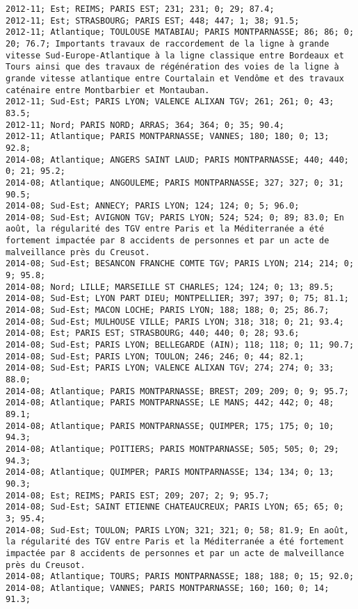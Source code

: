 \documentclass{article}
\begin{document}
\begin{Verbatim}[commandchars=\\\{\}]
2012-11; Est; REIMS; PARIS EST; 231; 231; 0; 29; 87.4; 
2012-11; Est; STRASBOURG; PARIS EST; 448; 447; 1; 38; 91.5; 
2012-11; Atlantique; TOULOUSE MATABIAU; PARIS MONTPARNASSE; 86; 86; 0; 20; 76.7; Importants travaux de raccordement de la ligne à grande vitesse Sud-Europe-Atlantique à la ligne classique entre Bordeaux et Tours ainsi que des travaux de régénération des voies de la ligne à grande vitesse atlantique entre Courtalain et Vendôme et des travaux caténaire entre Montbarbier et Montauban.
2012-11; Sud-Est; PARIS LYON; VALENCE ALIXAN TGV; 261; 261; 0; 43; 83.5; 
2012-11; Nord; PARIS NORD; ARRAS; 364; 364; 0; 35; 90.4; 
2012-11; Atlantique; PARIS MONTPARNASSE; VANNES; 180; 180; 0; 13; 92.8; 
2014-08; Atlantique; ANGERS SAINT LAUD; PARIS MONTPARNASSE; 440; 440; 0; 21; 95.2; 
2014-08; Atlantique; ANGOULEME; PARIS MONTPARNASSE; 327; 327; 0; 31; 90.5; 
2014-08; Sud-Est; ANNECY; PARIS LYON; 124; 124; 0; 5; 96.0; 
2014-08; Sud-Est; AVIGNON TGV; PARIS LYON; 524; 524; 0; 89; 83.0; En août, la régularité des TGV entre Paris et la Méditerranée a été fortement impactée par 8 accidents de personnes et par un acte de malveillance près du Creusot.
2014-08; Sud-Est; BESANCON FRANCHE COMTE TGV; PARIS LYON; 214; 214; 0; 9; 95.8; 
2014-08; Nord; LILLE; MARSEILLE ST CHARLES; 124; 124; 0; 13; 89.5; 
2014-08; Sud-Est; LYON PART DIEU; MONTPELLIER; 397; 397; 0; 75; 81.1; 
2014-08; Sud-Est; MACON LOCHE; PARIS LYON; 188; 188; 0; 25; 86.7; 
2014-08; Sud-Est; MULHOUSE VILLE; PARIS LYON; 318; 318; 0; 21; 93.4; 
2014-08; Est; PARIS EST; STRASBOURG; 440; 440; 0; 28; 93.6; 
2014-08; Sud-Est; PARIS LYON; BELLEGARDE (AIN); 118; 118; 0; 11; 90.7; 
2014-08; Sud-Est; PARIS LYON; TOULON; 246; 246; 0; 44; 82.1; 
2014-08; Sud-Est; PARIS LYON; VALENCE ALIXAN TGV; 274; 274; 0; 33; 88.0; 
2014-08; Atlantique; PARIS MONTPARNASSE; BREST; 209; 209; 0; 9; 95.7; 
2014-08; Atlantique; PARIS MONTPARNASSE; LE MANS; 442; 442; 0; 48; 89.1; 
2014-08; Atlantique; PARIS MONTPARNASSE; QUIMPER; 175; 175; 0; 10; 94.3; 
2014-08; Atlantique; POITIERS; PARIS MONTPARNASSE; 505; 505; 0; 29; 94.3; 
2014-08; Atlantique; QUIMPER; PARIS MONTPARNASSE; 134; 134; 0; 13; 90.3; 
2014-08; Est; REIMS; PARIS EST; 209; 207; 2; 9; 95.7; 
2014-08; Sud-Est; SAINT ETIENNE CHATEAUCREUX; PARIS LYON; 65; 65; 0; 3; 95.4; 
2014-08; Sud-Est; TOULON; PARIS LYON; 321; 321; 0; 58; 81.9; En août, la régularité des TGV entre Paris et la Méditerranée a été fortement impactée par 8 accidents de personnes et par un acte de malveillance près du Creusot.
2014-08; Atlantique; TOURS; PARIS MONTPARNASSE; 188; 188; 0; 15; 92.0; 
2014-08; Atlantique; VANNES; PARIS MONTPARNASSE; 160; 160; 0; 14; 91.3; 

\end{Verbatim}
\end{document}
